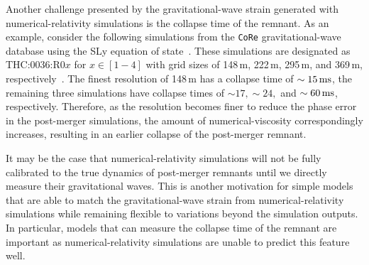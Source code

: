 \documentclass[../Thesis.tex]{subfiles}
\begin{document}
    Another challenge presented by the gravitational-wave strain generated with numerical-relativity simulations is the collapse time of the remnant.
    As an example, consider the following simulations from the \texttt{CoRe} gravitational-wave database using the SLy equation of state~\cite{Dietrich2018,Radice2016}.
    These simulations are designated as THC:0036:R0$x$ for $x \in [1-4]$ with grid sizes of 148\,m, 222\,m, 295\,m, and 369\,m, respectively~\cite{Radice2016}.
    The finest resolution of 148\,m has a collapse time of $\sim 15\,\mathrm{ms}$, the remaining three simulations have collapse times of $\sim 17, \sim 24,$ and $\sim 60\,\mathrm{ms}$, respectively.
    Therefore, as the resolution becomes finer to reduce the phase error in the post-merger simulations, the amount of numerical-viscosity correspondingly increases,  resulting in an earlier collapse of the post-merger remnant.
    \par
    
    It may be the case that numerical-relativity simulations will not be fully calibrated to the true dynamics of post-merger remnants until we directly measure their gravitational waves.
    This is another motivation for simple models that are able to match the gravitational-wave strain from numerical-relativity simulations while remaining flexible to variations beyond the simulation outputs.
    In particular, models that can measure the collapse time of the remnant are important as numerical-relativity simulations are unable to predict this feature well. \par

    







    
    
    
    

    
\end{document}
